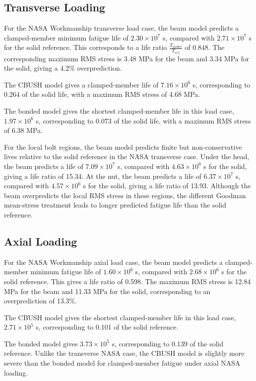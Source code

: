 \documentclass[a4paper,twoside]{bth}
\begin{document}
\newpage
\subsection{Transverse Loading}
For the NASA Workmanship transverse load case, the beam model predicts a clamped-member minimum fatigue life of $2.30\times10^{7}$ s, compared with $2.71\times10^{7}$ s for the solid reference. This corresponds to a life ratio $\tfrac{T_{model}}{T_{ref}}$ of $0.848$. The corresponding maximum \ac{RMS} stress is 3.48 MPa for the beam and 3.34 MPa for the solid, giving a 4.2\% overprediction.

The CBUSH model gives a clamped-member life of $7.16\times10^{6}$ s, corresponding to $0.264$ of the solid life, with a maximum \ac{RMS} stress of 4.68 MPa.

The bonded model gives the shortest clamped-member life in this load case, $1.97\times10^{6}$ s, corresponding to $0.073$ of the solid life, with a maximum \ac{RMS} stress of 6.38 MPa.

For the local bolt regions, the beam model predicts finite but non-conservative lives relative to the solid reference in the NASA transverse case. Under the head, the beam predicts a life of $7.09\times10^{7}$ s, compared with $4.63\times10^{6}$ s for the solid, giving a life ratio of 15.34. At the nut, the beam predicts a life of $6.37\times10^{7}$ s, compared with $4.57\times10^{6}$ s for the solid, giving a life ratio of 13.93. Although the beam overpredicts the local \ac{RMS} stress in these regions, the different Goodman mean-stress treatment leads to longer predicted fatigue life than the solid reference.

\subsection{Axial Loading}

For the NASA Workmanship axial load case, the beam model predicts a clamped-member minimum fatigue life of $1.60\times10^{6}$ s, compared with $2.68\times10^{6}$ s for the solid reference. This gives a life ratio of 0.598. The maximum \ac{RMS} stress is 12.84 MPa for the beam and 11.33 MPa for the solid, corresponding to an overprediction of 13.3\%.

The CBUSH model gives the shortest clamped-member life in this load case, $2.71\times10^{5}$ s, corresponding to 0.101 of the solid reference.

The bonded model gives $3.73\times10^{5}$ s, corresponding to 0.139 of the solid reference. Unlike the transverse NASA case, the CBUSH model is slightly more severe than the bonded model for clamped-member fatigue under axial NASA loading.
\end{document}
